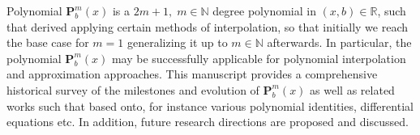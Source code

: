 Polynomial $\mathbf{P}^m_b(x)$ is a $2m+1, \; m\in\mathbb{N}$ degree polynomial in $(x,b) \in \mathbb{R}$,
such that derived applying certain methods of interpolation, so that initially we reach the base case for $m=1$
generalizing it up to $m\in\mathbb{N}$ afterwards.
In particular, the polynomial $\mathbf{P}^m_b(x)$ may be successfully applicable
for polynomial interpolation and approximation approaches.
This manuscript provides a comprehensive historical survey of the milestones and evolution of $\mathbf{P}^m_b(x)$
as well as related works such that based onto, for instance various polynomial identities, differential equations etc.
In addition, future research directions are proposed and discussed.
